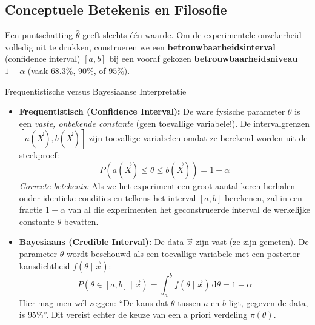 \documentclass[11pt,a4paper]{article}
\newcommand{\dd}{\mathrm{d}}
\begin{document}
\subsection{Conceptuele Betekenis en Filosofie}
Een puntschatting $\hat{\theta}$ geeft slechts één waarde. Om de experimentele onzekerheid volledig uit te drukken, construeren we een \textbf{betrouwbaarheidsinterval} (confidence interval) $[a, b]$ bij een vooraf gekozen \textbf{betrouwbaarheidsniveau} $1 - \alpha$ (vaak $68.3\%$, $90\%$, of $95\%$).

\begin{defbox}{Frequentistische versus Bayesiaanse Interpretatie}
\begin{itemize}[leftmargin=1.2em]
    \item \textbf{Frequentistisch (Confidence Interval):}
    De ware fysische parameter $\theta$ is een \emph{vaste, onbekende constante} (geen toevallige variabele!). De intervalgrenzen $[a(\vec{X}), b(\vec{X})]$ zijn toevallige variabelen omdat ze berekend worden uit de steekproef:
    \begin{equation}
        P\left( a(\vec{X}) \le \theta \le b(\vec{X}) \right) = 1 - \alpha
    \end{equation}
    \emph{Correcte betekenis:} Als we het experiment een groot aantal keren herhalen onder identieke condities en telkens het interval $[a, b]$ berekenen, zal in een fractie $1 - \alpha$ van al die experimenten het geconstrueerde interval de werkelijke constante $\theta$ bevatten.
    \item \textbf{Bayesiaans (Credible Interval):}
    De data $\vec{x}$ zijn vast (ze zijn gemeten). De parameter $\theta$ wordt beschouwd als een toevallige variabele met een posterior kansdichtheid $f(\theta \mid \vec{x})$:
    \begin{equation}
        P(\theta \in [a, b] \mid \vec{x}) = \int_a^b f(\theta \mid \vec{x}) \, \dd \theta = 1 - \alpha
    \end{equation}
    Hier mag men wél zeggen: ``De kans dat $\theta$ tussen $a$ en $b$ ligt, gegeven de data, is $95\%$''. Dit vereist echter de keuze van een a priori verdeling $\pi(\theta)$.
\end{itemize}
\end{defbox}
\end{document}
